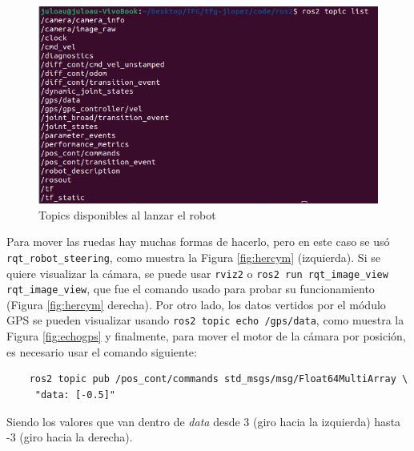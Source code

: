 \begin{figure} [h!]
	\begin{center}
		\includegraphics[width=12cm]{figs/cap6/topic.png}
	\end{center}
	\caption{Topics disponibles al lanzar el robot}
	\label{fig:topic}
\end{figure}


Para mover las ruedas hay muchas formas de hacerlo, pero en este caso se usó \verb|rqt_robot_steering|, como muestra la Figura \ref{fig:hercym} (izquierda). Si se quiere visualizar la cámara, se puede usar \verb|rviz2| o \verb|ros2 run rqt_image_view rqt_image_view|, que fue el comando usado para probar su funcionamiento (Figura \ref{fig:hercym} derecha). Por otro lado, los datos vertidos por el módulo \acs{GPS} se pueden visualizar usando \verb|ros2 topic echo /gps/data|, como muestra la Figura \ref{fig:echogps} y finalmente, para mover el motor de la cámara por posición, es necesario usar el comando siguiente: 

\begin{verbatim}
	ros2 topic pub /pos_cont/commands std_msgs/msg/Float64MultiArray \
	 "data: [-0.5]"
\end{verbatim} 

Siendo los valores que van dentro de \textit{data} desde 3 (giro hacia la izquierda) hasta -3 (giro hacia la derecha). 


